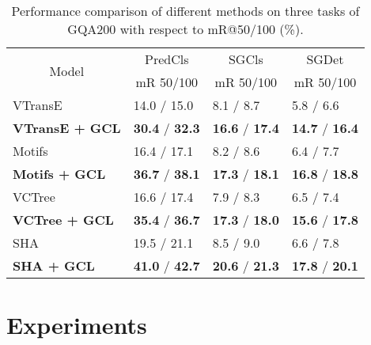 \documentclass[10pt,twocolumn,letterpaper]{article}
\begin{document}
\begin{table}[t]
	\small
	\vspace{0.0cm}
	\begin{tabular}{p{2.3cm}|p{1.7cm}<{\centering}|p{1.4cm}<{\centering}|p{1.4cm}<{\centering}}
		\hline
		\multicolumn{1}{c|}{\multirow{2}{*}{Model}} & \multicolumn{1}{c|}{PredCls}& \multicolumn{1}{c|}{SGCls}&\multicolumn{1}{c}{SGDet}
		\\ 
		\cline{2-4} 
		\multicolumn{1}{c|}{} & \multicolumn{1}{c|}{mR 50/100} & \multicolumn{1}{c|}{mR 50/100} & \multicolumn{1}{c}{mR 50/100} \\ \hline
		
		VTransE &14.0 / 15.0  & 8.1 / 8.7 & 5.8 / 6.6  \\ 
		\textbf{VTransE + GCL} &\textbf{30.4} / \textbf{32.3} &\textbf{16.6} / \textbf{17.4}  &\textbf{14.7} / \textbf{16.4}  \\
		\hline
		
		Motifs &16.4 / 17.1  &8.2 / 8.6  &6.4 / 7.7 \\ 
		\textbf{Motifs + GCL} &\textbf{36.7} / \textbf{38.1} &\textbf{17.3} / \textbf{18.1}  &\textbf{16.8} / \textbf{18.8}  \\
		\hline
		
		VCTree &16.6 / 17.4 & 7.9 / 8.3  & 6.5 / 7.4  \\
		\textbf{VCTree + GCL} &\textbf{35.4} / \textbf{36.7} &\textbf{17.3} / \textbf{18.0} &\textbf{15.6} / \textbf{17.8}\\
		 \hline
		 
		SHA &19.5 / 21.1  & 8.5 / 9.0  & 6.6 / 7.8    \\
		\textbf{SHA + GCL} &\textbf{41.0} / \textbf{42.7} &\textbf{20.6} / \textbf{21.3}  &\textbf{17.8} / \textbf{20.1}  \\
		 \hline
		
	\end{tabular}
\vspace{0.02cm}
\caption{Performance comparison of different methods on three tasks of GQA200 with respect to mR@50/100 (\%).}
\vspace{-0.4cm}
\label{result_GQA}
\end{table}


\section{Experiments}
\end{document}
